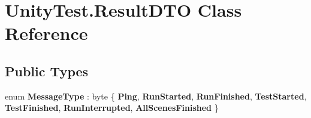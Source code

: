 \hypertarget{class_unity_test_1_1_result_d_t_o}{}\section{Unity\+Test.\+Result\+D\+TO Class Reference}
\label{class_unity_test_1_1_result_d_t_o}
\subsection*{Public Types}
\begin{DoxyCompactItemize}
\item 
\mbox{\label{class_unity_test_1_1_result_d_t_o_ab374f2ebcb3ae9b4cbf266c1c9372942}} 
enum {\bfseries Message\+Type} \+: byte \{ \newline
{\bfseries Ping}, 
{\bfseries Run\+Started}, 
{\bfseries Run\+Finished}, 
{\bfseries Test\+Started}, 
\newline
{\bfseries Test\+Finished}, 
{\bfseries Run\+Interrupted}, 
{\bfseries All\+Scenes\+Finished}
 \}
\end{DoxyCompactItemize}
